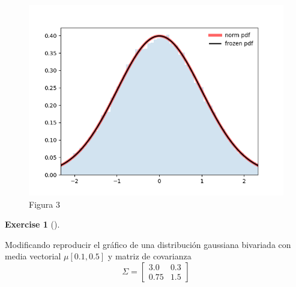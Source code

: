 \documentclass[
  letterpaper,
  DIV=11,
  numbers=noendperiod]{scrreprt}
\theoremstyle{plain}
\theoremstyle{definition}
\newtheorem{exercise}{Exercise}[chapter]
\theoremstyle{remark}
\begin{document}
\begin{figure}

{\centering \includegraphics{Figure_3.png}

}

\caption{Figura 3}

\end{figure}

\begin{exercise}[]\protect\hypertarget{exr-3}{}\label{exr-3}

Modificando reproducir el gráfico de una distribución gaussiana
bivariada con media vectorial \(\mu[0.1, 0.5]\) y matriz de covarianza
\[\Sigma=
\begin{bmatrix}
3.0 & 0.3\\
0.75 & 1.5
\end{bmatrix}
\]

\end{exercise}
\end{document}
